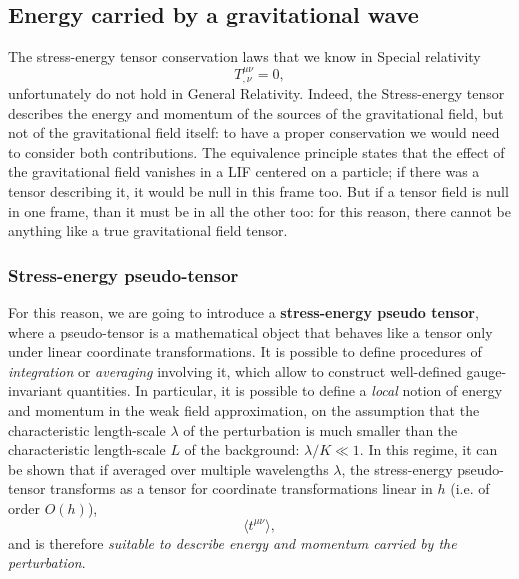 \subsection{Energy carried by a gravitational wave}
The stress-energy tensor conservation laws that we know in Special relativity
\[
    T^{\mu\nu}_{,\nu}=0,
\]
unfortunately do not hold in General Relativity.
Indeed, the Stress-energy tensor describes the energy and momentum of the sources of the gravitational field, but not of the gravitational field itself: to have a proper conservation we would need to consider both contributions.
The equivalence principle states that the effect of the gravitational field vanishes in a LIF centered on a particle; if there was a tensor describing it, it would be null in this frame too.
But if a tensor field is null in one frame, than it must be in all the other too: for this reason, there cannot be anything like a true gravitational field tensor.

\subsubsection{Stress-energy pseudo-tensor}
For this reason, we are going to introduce a \textbf{stress-energy pseudo tensor}, where a pseudo-tensor is a mathematical object that behaves like a tensor only under linear coordinate transformations.
It is possible to define procedures of \textit{integration} or \textit{averaging} involving it, which allow to construct well-defined gauge-invariant quantities.
In particular, it is possible to define a \textit{local} notion of energy and momentum in the weak field approximation, on the assumption that the characteristic length-scale $\lambda$ of the perturbation is much smaller than the characteristic length-scale $L$ of the background: $\lambda/K\ll 1$.
In this regime, it can be shown that if averaged over multiple wavelengths $\lambda$, the stress-energy pseudo-tensor transforms as a tensor for coordinate transformations linear in $h$ (i.e. of order $O(h)$),
\[
    \langle t^{\mu\nu}\rangle,
\]
and is therefore \textit{suitable to describe energy and momentum carried by the perturbation}.


